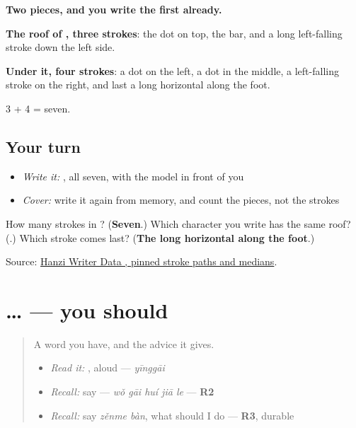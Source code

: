 \begin{quote}
\end{quote}

\textbf{Two pieces, and you write the first already.}

\textbf{The roof of , three strokes}: the dot on top, the bar, and a long left-falling stroke down the left side.

\textbf{Under it, four strokes}: a dot on the left, a dot in the middle, a left-falling stroke on the right, and last a long horizontal along the foot.

3 + 4 = seven.

\subsection*{Your turn}
\begin{itemize}
\raggedright
  \item \emph{Write it:} , all seven, with the model in front of you
  \item \emph{Cover:} write it again from memory, and count the pieces, not the strokes
\end{itemize}

\begin{tcolorbox}[breakable,colback=teal!4,colframe=teal!35!black,title={Before you move on}]
How many strokes in ? (\textbf{Seven}.) Which character you write has the same roof? (\textbf{}.) Which stroke comes last? (\textbf{The long horizontal along the foot}.)

Source: \href{https://raw.githubusercontent.com/chanind/hanzi-writer-data/68d10a4b21150cae5e1ebbd223eed289cf32d90c/data/\%E5\%BA\%94.json}{Hanzi Writer Data , pinned stroke paths and medians}.
\end{tcolorbox}
\section[\texorpdfstring{\zh{你应该}… (nǐ yīnggāi …)}{你应该… (nǐ yīnggāi …)}]{… — you should}

\label{lesson:ZH-C282-yinggai-grammar}



\begin{quote}
A word you have, and the advice it gives.

\begin{itemize}
\raggedright
  \item \emph{Read it:} , aloud — \emph{yīnggāi}
  \item \emph{Recall:} say  — \emph{wǒ gāi huí jiā le} — \textbf{R2}
  \item \emph{Recall:} say \emph{zěnme bàn}, what should I do — \textbf{R3}, durable
\end{itemize}
\end{quote}

